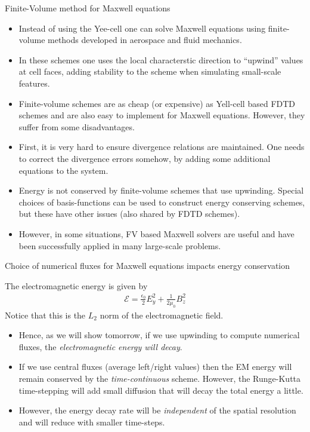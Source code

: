 \documentclass[pdf]{beamer}
\theoremstyle{definition}
\begin{document}
\begin{frame}{Finite-Volume method for Maxwell equations}
  \small%
  \begin{itemize}
  \item Instead of using the Yee-cell one can solve Maxwell equations
    using finite-volume methods developed in aerospace and fluid
    mechanics.
  \item In these schemes one uses the local characterstic direction to
    ``upwind'' values at cell faces, adding stability to the scheme
    when simulating small-scale features.
  \item Finite-volume schemes are as cheap (or expensive) as Yell-cell
    based FDTD schemes and are also easy to implement for Maxwell
    equations. However, they suffer from some disadvantages.
  \item First, it is very hard to ensure divergence relations are
    maintained. One needs to correct the divergence errors somehow, by
    adding some additional equations to the system.
  \item Energy is not conserved by finite-volume schemes that use
    upwinding. Special choices of basis-functions can be used to
    construct energy conserving schemes, but these have other issues
    (also shared by FDTD schemes).
  \item However, in some situations, FV based Maxwell solvers are
    useful and have been successfully applied in many large-scale
    problems.
  \end{itemize}
\end{frame}  


\begin{frame}{Choice of numerical fluxes for Maxwell equations impacts
    energy conservation}

  The electromagnetic energy is given by
  \begin{align*}
    \mathcal{E} = \frac{\epsilon_0}{2} E_y^2 + \frac{1}{2\mu_0} B_z^2
  \end{align*}
  Notice that this is the $L_2$ norm of the electromagnetic
  field. 
  \begin{itemize}
  \item Hence, as we will show tomorrow, if we use upwinding to
    compute numerical fluxes, the \emph{electromagnetic energy will
      decay}.
  \item If we use central fluxes (average left/right values) then the
    EM energy will remain conserved by the \emph{time-continuous}
    scheme. However, the Runge-Kutta time-stepping will add small
    diffusion that will decay the total energy a little.
  \item However, the energy decay rate will be \emph{independent} of
    the spatial resolution and will reduce with smaller time-steps.
  \end{itemize}
\end{frame}

\end{document}
